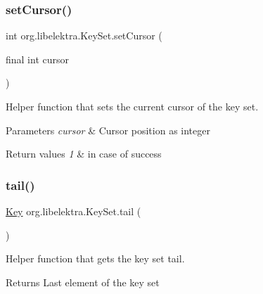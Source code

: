 \subsubsection{\texorpdfstring{setCursor()}{setCursor()}}
{\footnotesize\ttfamily int org.\+libelektra.\+Key\+Set.\+set\+Cursor (\begin{DoxyParamCaption}\item[{final int}]{cursor }\end{DoxyParamCaption})\hspace{0.3cm}{\ttfamily [inline]}}



Helper function that sets the current cursor of the key set. 


\begin{DoxyParams}{Parameters}
{\em cursor} & Cursor position as integer \\
\hline
\end{DoxyParams}

\begin{DoxyRetVals}{Return values}
{\em 1} & in case of success \\
\hline
\end{DoxyRetVals}
\mbox{\label{classorg_1_1libelektra_1_1KeySet_ab81aff6c88595b3f4c3307d1f996857f}} 
\subsubsection{\texorpdfstring{tail()}{tail()}}
{\footnotesize\ttfamily \mbox{\hyperlink{classorg_1_1libelektra_1_1Key}{Key}} org.\+libelektra.\+Key\+Set.\+tail (\begin{DoxyParamCaption}{ }\end{DoxyParamCaption})\hspace{0.3cm}{\ttfamily [inline]}}



Helper function that gets the key set tail. 

\begin{DoxyReturn}{Returns}
Last element of the key set 
\end{DoxyReturn}
\mbox{\label{classorg_1_1libelektra_1_1KeySet_a9c1e2918acce8c7cda5be406989c87af}} 
